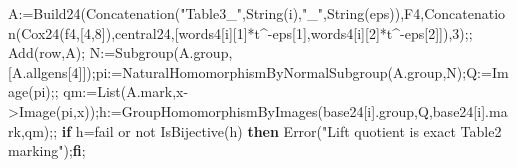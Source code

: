 \documentclass[
  10pt,
  letterpaper,
]{article}
\newenvironment{Shaded}{}{}
\newcommand{\BuiltInTok}[1]{\textcolor[rgb]{0.00,0.50,0.00}{#1}}
\newcommand{\ConstantTok}[1]{\textcolor[rgb]{0.53,0.00,0.00}{#1}}
\newcommand{\ControlFlowTok}[1]{\textcolor[rgb]{0.00,0.44,0.13}{\textbf{#1}}}
\newcommand{\FloatTok}[1]{\textcolor[rgb]{0.25,0.63,0.44}{#1}}
\newcommand{\NormalTok}[1]{#1}
\newcommand{\OperatorTok}[1]{\textcolor[rgb]{0.40,0.40,0.40}{#1}}
\newcommand{\StringTok}[1]{\textcolor[rgb]{0.25,0.44,0.63}{#1}}
\newcommand{\VariableTok}[1]{\textcolor[rgb]{0.10,0.09,0.49}{#1}}
\begin{document}
\begin{Shaded}
\begin{Highlighting}[]
  \VariableTok{A}\OperatorTok{:=}\VariableTok{Build24}\NormalTok{(}\BuiltInTok{Concatenation}\NormalTok{(}\StringTok{"Table3\_"}\OperatorTok{,}\BuiltInTok{String}\NormalTok{(}\VariableTok{i}\NormalTok{)}\OperatorTok{,}\StringTok{"\_"}\OperatorTok{,}\BuiltInTok{String}\NormalTok{(}\VariableTok{eps}\NormalTok{))}\OperatorTok{,}\VariableTok{F4}\OperatorTok{,}\BuiltInTok{Concatenation}\NormalTok{(}\VariableTok{Cox24}\NormalTok{(}\VariableTok{f4}\OperatorTok{,}\NormalTok{[}\FloatTok{4}\OperatorTok{,}\FloatTok{8}\NormalTok{])}\OperatorTok{,}\VariableTok{central24}\OperatorTok{,}\NormalTok{[}\VariableTok{words4}\NormalTok{[}\VariableTok{i}\NormalTok{][}\FloatTok{1}\NormalTok{]}\OperatorTok{*}\VariableTok{t}\OperatorTok{\^{}{-}}\VariableTok{eps}\NormalTok{[}\FloatTok{1}\NormalTok{]}\OperatorTok{,}\VariableTok{words4}\NormalTok{[}\VariableTok{i}\NormalTok{][}\FloatTok{2}\NormalTok{]}\OperatorTok{*}\VariableTok{t}\OperatorTok{\^{}{-}}\VariableTok{eps}\NormalTok{[}\FloatTok{2}\NormalTok{]])}\OperatorTok{,}\FloatTok{3}\NormalTok{)}\OperatorTok{;;}
  \BuiltInTok{Add}\NormalTok{(}\VariableTok{row}\OperatorTok{,}\VariableTok{A}\NormalTok{)}\OperatorTok{;}
  \VariableTok{N}\OperatorTok{:=}\BuiltInTok{Subgroup}\NormalTok{(}\VariableTok{A}\NormalTok{.}\VariableTok{group}\OperatorTok{,}\NormalTok{[}\VariableTok{A}\NormalTok{.}\VariableTok{allgens}\NormalTok{[}\FloatTok{4}\NormalTok{]])}\OperatorTok{;}\VariableTok{pi}\OperatorTok{:=}\BuiltInTok{NaturalHomomorphismByNormalSubgroup}\NormalTok{(}\VariableTok{A}\NormalTok{.}\VariableTok{group}\OperatorTok{,}\VariableTok{N}\NormalTok{)}\OperatorTok{;}\VariableTok{Q}\OperatorTok{:=}\BuiltInTok{Image}\NormalTok{(}\VariableTok{pi}\NormalTok{)}\OperatorTok{;;}
  \VariableTok{qm}\OperatorTok{:=}\BuiltInTok{List}\NormalTok{(}\VariableTok{A}\NormalTok{.}\VariableTok{mark}\OperatorTok{,}\VariableTok{x}\OperatorTok{{-}\textgreater{}}\BuiltInTok{Image}\NormalTok{(}\VariableTok{pi}\OperatorTok{,}\VariableTok{x}\NormalTok{))}\OperatorTok{;}\VariableTok{h}\OperatorTok{:=}\BuiltInTok{GroupHomomorphismByImages}\NormalTok{(}\VariableTok{base24}\NormalTok{[}\VariableTok{i}\NormalTok{].}\VariableTok{group}\OperatorTok{,}\VariableTok{Q}\OperatorTok{,}\VariableTok{base24}\NormalTok{[}\VariableTok{i}\NormalTok{].}\VariableTok{mark}\OperatorTok{,}\VariableTok{qm}\NormalTok{)}\OperatorTok{;;}
  \ControlFlowTok{if} \VariableTok{h}\OperatorTok{=}\ConstantTok{fail} \ConstantTok{or} \ConstantTok{not} \BuiltInTok{IsBijective}\NormalTok{(}\VariableTok{h}\NormalTok{) }\ControlFlowTok{then} \BuiltInTok{Error}\NormalTok{(}\StringTok{"Lift quotient is exact Table2 marking"}\NormalTok{)}\OperatorTok{;}\ControlFlowTok{fi}\OperatorTok{;}

\end{Highlighting}
\end{Shaded}
\end{document}

